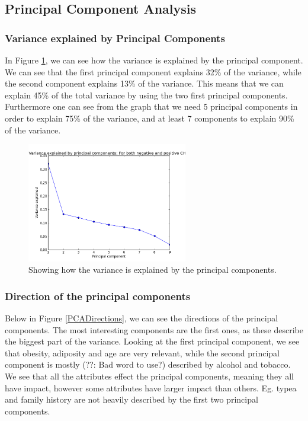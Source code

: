 \subsection{Principal Component Analysis}

\subsubsection{Variance explained by Principal Components}

In Figure \ref{VariancePCA}, we can see how the variance is explained by the principal component. We can see that the first principal component explains 32\% of the variance, while the second component explains 13\% of the variance. This means that we can explain 45\% of the total variance by using the two first principal components. Furthermore one can see from the graph that we need 5 principal components in order to explain 75\% of the variance, and at least 7 components to explain 90\% of the variance.

\begin{figure}[H]
\centering
\includegraphics[width=7cm, keepaspectratio=true]{pictures/PCAPosAndNeg.png}
\caption{Showing how the variance is explained by the principal components.}
\label{VariancePCA}
\end{figure}

\subsubsection{Direction of the principal components}

Below in Figure \ref{PCADirections}, we can see the directions of the principal components. The most interesting components are the first ones, as these describe the biggest part of the variance. Looking at the first principal component, we see that obesity, adiposity and age are very relevant, while the second principal component is mostly (??: Bad word to use?) described by alcohol and tobacco. We see that all the attributes effect the principal components, meaning they all have impact, however some attributes have larger impact than others. Eg. typea and family history are not heavily described by the first two principal components.

